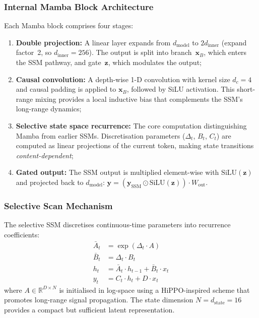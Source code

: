 \documentclass[conference]{IEEEtran}
\newcommand{\Real}{\mathbb{R}}
\begin{document}
\subsubsection{Internal Mamba Block Architecture}

Each Mamba block comprises four stages:
\begin{enumerate}[nosep]
    \item \textbf{Double projection:} A linear layer expands
          from $d_{\text{model}}$ to $2d_{\text{inner}}$ (expand
          factor~2, so $d_{\text{inner}} = 256$). The output is
          split into branch~$\mathbf{x}_B$, which enters the SSM
          pathway, and gate~$\mathbf{z}$, which modulates the output;
    \item \textbf{Causal convolution:} A depth-wise 1-D convolution
          with kernel size $d_c = 4$ and causal padding is applied
          to $\mathbf{x}_B$, followed by SiLU activation. This
          short-range mixing provides a local inductive bias that
          complements the SSM's long-range dynamics;
    \item \textbf{Selective state space recurrence:} The core
          computation distinguishing Mamba from earlier SSMs.
          Discretisation parameters ($\Delta_t$, $B_t$, $C_t$)
          are computed as linear projections of the current token,
          making state transitions \emph{content-dependent};
    \item \textbf{Gated output:} The SSM output is multiplied
          element-wise with $\mathrm{SiLU}(\mathbf{z})$ and
          projected back to $d_{\text{model}}$:
          $\mathbf{y} = (\mathbf{y}_{\text{SSM}} \odot
          \mathrm{SiLU}(\mathbf{z})) \cdot W_{\text{out}}$.
\end{enumerate}

\subsubsection{Selective Scan Mechanism}

The selective SSM discretises continuous-time parameters into
recurrence coefficients:
\begin{align}
    \bar{A}_t &= \exp(\Delta_t \cdot A) \label{eq:disc_a} \\
    \bar{B}_t &= \Delta_t \cdot B_t \label{eq:disc_b} \\
    h_t &= \bar{A}_t \cdot h_{t-1} + \bar{B}_t \cdot x_t
    \label{eq:ssm_recurrence} \\
    y_t &= C_t \cdot h_t + D \cdot x_t \label{eq:ssm_output}
\end{align}
where $A \in \Real^{D \times N}$ is initialised in log-space
using a HiPPO-inspired scheme that promotes long-range signal
propagation. The state dimension $N = d_{\text{state}} = 16$
provides a compact but sufficient latent representation.
\end{document}
